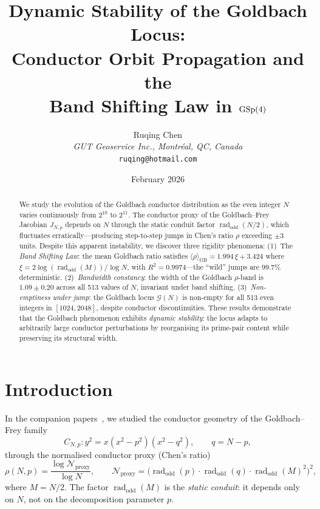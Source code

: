 \documentclass[11pt,a4paper]{article}
\title{Dynamic Stability of the Goldbach Locus:\\
Conductor Orbit Propagation and the\\
Band Shifting Law in $\operatorname{GSp}(4)$}
\author{Ruqing Chen\\[4pt]
\textit{GUT Geoservice Inc., Montr\'{e}al, QC, Canada}\\[2pt]
\texttt{ruqing@hotmail.com}}
\date{February 2026}
\theoremstyle{definition}
\DeclareMathOperator{\rad}{rad}
\begin{document}
\maketitle

\begin{abstract}
We study the evolution of the Goldbach conductor distribution as the even integer
$N$ varies continuously from $2^{10}$ to $2^{11}$.  The conductor proxy of the
Goldbach--Frey Jacobian $J_{N,p}$ depends on $N$ through the static conduit factor
$\rad_{\mathrm{odd}}(N/2)$, which fluctuates erratically---producing step-to-step
jumps in Chen's ratio $\rho$ exceeding $\pm 3$ units.  Despite this apparent
instability, we discover three rigidity phenomena:
(1)~The \emph{Band Shifting Law}: the mean Goldbach ratio satisfies
$\langle\rho\rangle_{\mathrm{GB}} = 1.994\,\xi + 3.424$ where
$\xi = 2\log(\rad_{\mathrm{odd}}(M))/\log N$, with $R^2 = 0.9974$---the ``wild''
jumps are $99.7\%$ deterministic.
(2)~\emph{Bandwidth constancy}: the width of the Goldbach $\rho$-band is
$1.09 \pm 0.20$ across all 513 values of $N$, invariant under band shifting.
(3)~\emph{Non-emptiness under jump}: the Goldbach locus $\mathscr{G}(N)$ is
non-empty for all 513 even integers in $[1024, 2048]$, despite conductor
discontinuities.  These results demonstrate that the Goldbach phenomenon exhibits
\emph{dynamic stability}: the locus adapts to arbitrarily large conductor
perturbations by reorganising its prime-pair content while preserving its
structural width.
\end{abstract}


\section{Introduction}

In the companion papers~\cite{Chen2026GM,Chen2026GMII,Chen2026AV}, we studied the
conductor geometry of the Goldbach--Frey family
\begin{equation}\label{eq:curve}
  C_{N,p} : y^2 = x(x^2 - p^2)(x^2 - q^2), \qquad q = N - p,
\end{equation}
through the normalised conductor proxy (Chen's ratio)
\begin{equation}\label{eq:rho}
  \rho(N, p) = \frac{\log \mathcal{N}_{\mathrm{proxy}}}{\log N},
  \qquad
  \mathcal{N}_{\mathrm{proxy}} =
    \bigl(\rad_{\mathrm{odd}}(p)\cdot\rad_{\mathrm{odd}}(q)\cdot
          \rad_{\mathrm{odd}}(M)^2\bigr)^2,
\end{equation}
where $M = N/2$.  The factor $\rad_{\mathrm{odd}}(M)$ is the \emph{static conduit}:
it depends only on $N$, not on the decomposition parameter $p$.
\end{document}
